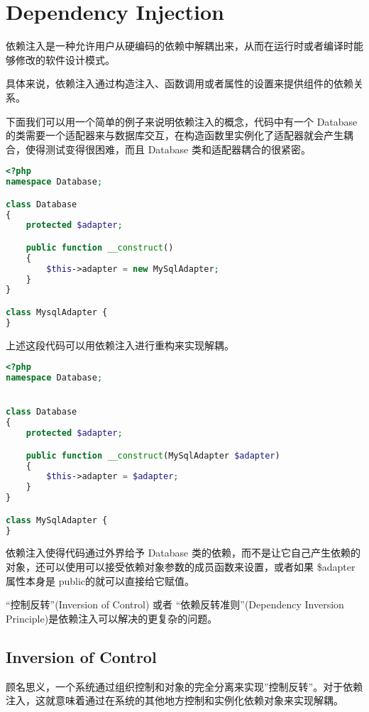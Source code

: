 \section{Dependency Injection}

依赖注入是一种允许用户从硬编码的依赖中解耦出来，从而在运行时或者编译时能够修改的软件设计模式。

具体来说，依赖注入通过构造注入、函数调用或者属性的设置来提供组件的依赖关系。

下面我们可以用一个简单的例子来说明依赖注入的概念，代码中有一个 Database 的类需要一个适配器来与数据库交互，在构造函数里实例化了适配器就会产生耦合，使得测试变得很困难，而且 Database 类和适配器耦合的很紧密。

\begin{lstlisting}[language=PHP]
<?php
namespace Database;

class Database
{
    protected $adapter;

    public function __construct()
    {
        $this->adapter = new MySqlAdapter;
    }
}

class MysqlAdapter {
}
\end{lstlisting}

上述这段代码可以用依赖注入进行重构来实现解耦。



\begin{lstlisting}[language=PHP]
<?php
namespace Database;


class Database 
{
    protected $adapter;

    public function __construct(MySqlAdapter $adapter) 
    {
        $this->adapter = $adapter;
    }
}

class MySqlAdapter {
}
\end{lstlisting}

依赖注入使得代码通过外界给予 Database 类的依赖，而不是让它自己产生依赖的对象，还可以使用可以接受依赖对象参数的成员函数来设置，或者如果 \$adapter 属性本身是 public的就可以直接给它赋值。

“控制反转”(Inversion of Control) 或者 “依赖反转准则”(Dependency Inversion Principle)是依赖注入可以解决的更复杂的问题。

\subsection{Inversion of Control}

顾名思义，一个系统通过组织控制和对象的完全分离来实现”控制反转”。对于依赖注入，这就意味着通过在系统的其他地方控制和实例化依赖对象来实现解耦。

